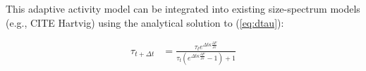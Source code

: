 \documentclass{article}\usepackage[]{graphicx}\usepackage[]{color}
\begin{document}
This adaptive activity model can be integrated into existing size-spectrum models (e.g., CITE Hartvig) using the analytical solution to (\ref{eq:dtau}):

\begin{align}
\tau_{t+\Delta t} &= \frac{\tau_t e^{\Delta t \kappa \frac{\partial F}{\partial \tau}}}{\tau_t(e^{\Delta t \kappa \frac{\partial F}{\partial \tau}} - 1) + 1}
\end{align}

\printbibliography 
\end{document}
